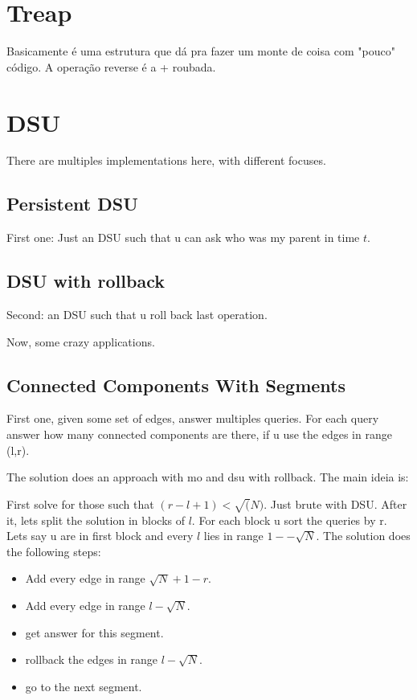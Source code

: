         
        
    \section{Treap}
    Basicamente é uma estrutura que dá pra fazer um monte de coisa com "pouco"  código. A operação reverse é a + roubada.
    
    

    \section{DSU}
    There are multiples implementations here, with different focuses.

    \subsection{Persistent DSU}
    First one: Just an DSU such that u can ask who was my parent in time $t$.
    

    
    \subsection{DSU with rollback}
    Second: an DSU such that u roll back last operation.
    

    Now, some crazy applications.
    \subsection{Connected Components With Segments}
    
    First one, given some set of edges, answer multiples queries. For each query answer how many connected components are there, if u use the edges in range (l,r).

    The solution does an approach with mo and dsu with rollback. The main ideia is:

    First solve for those such that $(r-l+1) < \sqrt(N)$. Just brute with DSU.
    After it, lets split the solution in blocks of $l$. 
    For each block u sort the queries by r. Lets say u are in first block and every $l$ lies in range $1--\sqrt{N}$.
    The solution does the following steps:
    \begin{itemize}
        \item Add every edge in range $\sqrt{N}+1-r$.
        \item Add every edge in range $l-\sqrt{N}$.
        \item get answer for this segment.
        \item rollback the edges in range $l-\sqrt{N}$.
        \item go to the next segment.
    \end{itemize}


